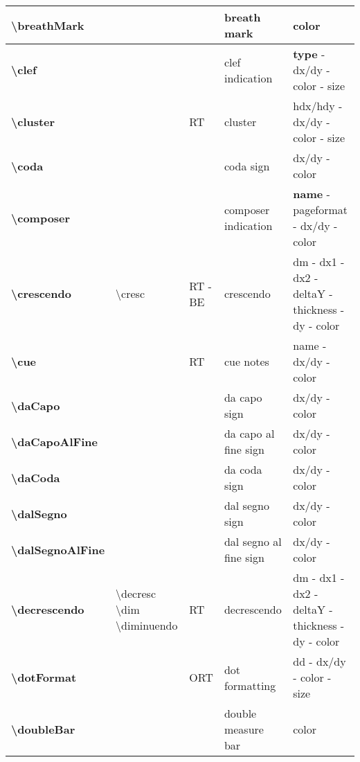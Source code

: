 \documentclass[a4paper, landscape, 10pt]{article}
\begin{document}
\begin{tabularx}{\linewidth}{p{3cm}p{4.5cm}p{3cm}p{5.5cm}l}
    \hline
    \textbf{\textbackslash{}breathMark}&&&breath mark&color\\
    \hline
    \textbf{\textbackslash{}clef}&&&clef indication&\textbf{type} - dx/dy - color - size\\
    \hline
    \textbf{\textbackslash{}cluster}&&RT&cluster&hdx/hdy - dx/dy - color - size\\
    \hline
    \textbf{\textbackslash{}coda}&&&coda sign&dx/dy - color\\
    \hline
    \textbf{\textbackslash{}composer}&&&composer indication&\textbf{name} - pageformat - dx/dy - color\\
    \hline
    \textbf{\textbackslash{}crescendo}&\textbackslash{}cresc&RT - BE&crescendo&dm - dx1 - dx2 - deltaY - thickness - dy - color\\
    \hline
	\textbf{\textbackslash{}cue}&&RT&cue notes&name - dx/dy - color\\
    \hline
    \textbf{\textbackslash{}daCapo}&&&da capo sign&dx/dy - color\\
    \hline
    \textbf{\textbackslash{}daCapoAlFine}&&&da capo al fine sign&dx/dy - color\\
    \hline
    \textbf{\textbackslash{}daCoda}&&&da coda sign&dx/dy - color\\
    \hline
    \textbf{\textbackslash{}dalSegno}&&&dal segno sign&dx/dy - color\\
    \hline
    \textbf{\textbackslash{}dalSegnoAlFine}&&&dal segno al fine sign&dx/dy - color\\
    \hline
    \textbf{\textbackslash{}decrescendo}&\textbackslash{}decresc \textbackslash{}dim \textbackslash{}diminuendo&RT&decrescendo&dm - dx1 - dx2 - deltaY - thickness - dy - color\\
    \hline
    \textbf{\textbackslash{}dotFormat}&&ORT&dot formatting&dd - dx/dy - color - size\\
    \hline
    \textbf{\textbackslash{}doubleBar}&&&double measure bar&color\\
    \hline

\end{tabularx}
\end{document}
